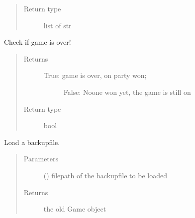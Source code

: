 \documentclass[letterpaper,10pt,english]{sphinxmanual}
\begin{document}
\begin{fulllineitems}
\begin{fulllineitems}
\begin{quote}
\begin{description}
\item[{Return type}] \leavevmode
list of str

\end{description}\end{quote}

\end{fulllineitems}


\begin{fulllineitems}
\label{\detokenize{chatwolf:chatwolf.game.Game.is_end}}
Check if game is over!
\begin{quote}\begin{description}
\item[{Returns}] \leavevmode
\begin{description}
\item[{True: game is over, on party won;}] \leavevmode
False: Noone won yet, the game is still on

\end{description}


\item[{Return type}] \leavevmode
bool

\end{description}\end{quote}

\end{fulllineitems}


\begin{fulllineitems}
\label{\detokenize{chatwolf:chatwolf.game.Game.load_bkp}}
Load a backup\sphinxhyphen{}file.
\begin{quote}\begin{description}
\item[{Parameters}] \leavevmode
{} () \textendash{} filepath of the backup\sphinxhyphen{}file to be loaded

\item[{Returns}] \leavevmode
the old Game object


\end{description}
\end{quote}
\end{fulllineitems}
\end{fulllineitems}
\end{document}
